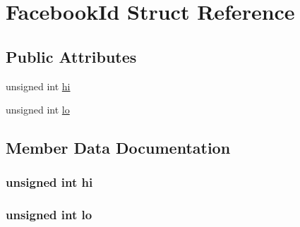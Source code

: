 \hypertarget{structefb_1_1FacebookId}{
\section{FacebookId Struct Reference}
\label{structefb_1_1FacebookId}
}
\subsection*{Public Attributes}
\begin{DoxyCompactItemize}
\item 
unsigned int \hyperlink{structefb_1_1FacebookId_a8b464957786ffe5a3406a4060f0da97f}{hi}
\item 
unsigned int \hyperlink{structefb_1_1FacebookId_af0c1fc19ce0b4c36f5b6a41b90012403}{lo}
\end{DoxyCompactItemize}


\subsection{Member Data Documentation}
\hypertarget{structefb_1_1FacebookId_a8b464957786ffe5a3406a4060f0da97f}{
\subsubsection[{hi}]{\setlength{\rightskip}{0pt plus 5cm}unsigned int {\bf hi}}}
\label{structefb_1_1FacebookId_a8b464957786ffe5a3406a4060f0da97f}
\hypertarget{structefb_1_1FacebookId_af0c1fc19ce0b4c36f5b6a41b90012403}{
\subsubsection[{lo}]{\setlength{\rightskip}{0pt plus 5cm}unsigned int {\bf lo}}}
\label{structefb_1_1FacebookId_af0c1fc19ce0b4c36f5b6a41b90012403}
